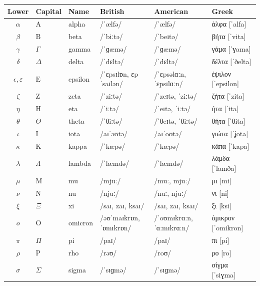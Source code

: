 \documentclass[11pt,a4paper]{article}
\theoremstyle{definition}
\theoremstyle{remark}
\providecommand{\ipa}[1]{#1}
\begin{document}
\begin{table}[htp]
\centering
\small
\setlength{\tabcolsep}{5pt}
\begin{tabular}{@{}clllll@{}}
\toprule
Lower & Capital & Name & British & American & Greek \\
\midrule
\(\alpha\) & \(\mathrm{A}\) & alpha & \ipa{/ˈælfə/} & \ipa{/ˈælfə/} & \ipa{άλφα [ˈalfa]} \\
\(\beta\) & \(\mathrm{B}\) & beta & \ipa{/ˈbiːtə/} & \ipa{/ˈbeɪtə/} & \ipa{βήτα [ˈvita]} \\
\(\gamma\) & \(\Gamma\) & gamma & \ipa{/ˈɡæmə/} & \ipa{/ˈɡæmə/} & \ipa{γάμα [ˈɣama]} \\
\(\delta\) & \(\Delta\) & delta & \ipa{/ˈdɛltə/} & \ipa{/ˈdɛltə/} & \ipa{δέλτα [ˈðelta]} \\
\(\epsilon,\varepsilon\) & \(\mathrm{E}\) & epsilon & \ipa{/ˈɛpsɪlɒn, ɛpˈsaɪlən/} & \ipa{/ˈɛpsəlɑːn, ˈɛpsɪlɑːn/} & \ipa{έψιλον [ˈepsilon]} \\
\(\zeta\) & \(\mathrm{Z}\) & zeta & \ipa{/ˈziːtə/} & \ipa{/ˈzeɪtə, ˈziːtə/} & \ipa{ζήτα [ˈzita]} \\
\(\eta\) & \(\mathrm{H}\) & eta & \ipa{/ˈiːtə/} & \ipa{/ˈeɪtə, ˈiːtə/} & \ipa{ήτα [ˈita]} \\
\(\theta\) & \(\Theta\) & theta & \ipa{/ˈθiːtə/} & \ipa{/ˈθeɪtə, ˈθiːtə/} & \ipa{θήτα [ˈθita]} \\
\(\iota\) & \(\mathrm{I}\) & iota & \ipa{/aɪˈəʊtə/} & \ipa{/aɪˈoʊtə/} & \ipa{γιώτα [ˈʝota]} \\
\(\kappa\) & \(\mathrm{K}\) & kappa & \ipa{/ˈkæpə/} & \ipa{/ˈkæpə/} & \ipa{κάπα [ˈkapa]} \\
\(\lambda\) & \(\Lambda\) & lambda & \ipa{/ˈlæmdə/} & \ipa{/ˈlæmdə/} & \ipa{λάμδα [ˈlamða]} \\
\(\mu\) & \(\mathrm{M}\) & mu & \ipa{/mjuː/} & \ipa{/muː, mjuː/} & \ipa{μι [mi]} \\
\(\nu\) & \(\mathrm{N}\) & nu & \ipa{/njuː/} & \ipa{/nuː, njuː/} & \ipa{νι [ni]} \\
\(\xi\) & \(\Xi\) & xi & \ipa{/saɪ, zaɪ, ksaɪ/} & \ipa{/saɪ, zaɪ, ksaɪ/} & \ipa{ξι [ksi]} \\
\(o\) & \(\mathrm{O}\) & omicron & \ipa{/əʊˈmaɪkrɒn, ˈɒmɪkrɒn/} & \ipa{/ˈoʊmɪkrɑːn, ˈɑːmɪkrɑːn/} & \ipa{όμικρον [ˈomikron]} \\
\(\pi\) & \(\Pi\) & pi & \ipa{/paɪ/} & \ipa{/paɪ/} & \ipa{πι [pi]} \\
\(\rho\) & \(\mathrm{P}\) & rho & \ipa{/rəʊ/} & \ipa{/roʊ/} & \ipa{ρο [ro]} \\
\(\sigma\) & \(\Sigma\) & sigma & \ipa{/ˈsɪɡmə/} & \ipa{/ˈsɪɡmə/} & \ipa{σίγμα [ˈsiɣma]} \\

\end{tabular}
\end{table}
\end{document}
